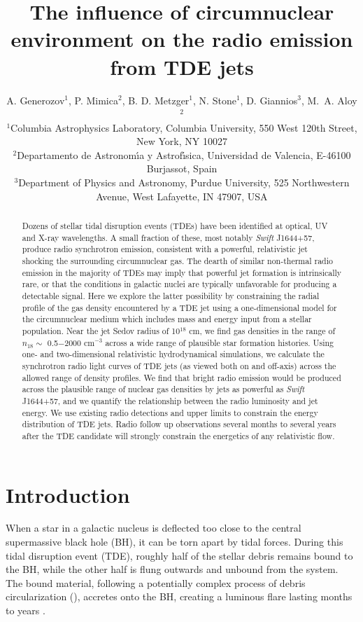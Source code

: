 \documentclass[usenatbib,fleqn]{mnras}
\title[Influence of CNM on TDE radio emission]{The influence of
  circumnuclear environment on the radio emission from TDE jets}
\author[Generozov et al.]{ A. Generozov$^{1}$, P. Mimica$^{2}$,
  B. D. Metzger$^{1}$, N. Stone$^{1}$, D. Giannios$^{3}$, 
  M.~A. Aloy$^{2}$
  \\
  $^{1}$Columbia Astrophysics Laboratory, Columbia University, 550 West 120th Street, New York, NY 10027\\
  $^{2}$Departamento de Astronom\'{\i}a y Astrof\'{\i}sica, Universidad de Valencia, E-46100 Burjassot, Spain\\
  $^{3}$Department of Physics and Astronomy, Purdue University, 525
  Northwestern Avenue, West Lafayette, IN 47907, USA}
\begin{document}
\maketitle
\begin{abstract}
  Dozens of stellar tidal disruption events (TDEs) have been
  identified at optical, UV and X-ray wavelengths.  A small fraction
  of these, most notably {\it Swift} J1644+57, produce radio
  synchrotron emission, consistent with a powerful, relativistic jet
  shocking the surrounding circumnuclear gas.  The dearth of similar
  non-thermal radio emission in the majority of TDEs may imply that
  powerful jet formation is intrinsically rare, or that the conditions
  in galactic nuclei are typically unfavorable for producing a
  detectable signal.  Here we explore the latter possibility by
  constraining the radial profile of the gas density encountered by a
  TDE jet using a one-dimensional model for the circumnuclear medium
  which includes mass and energy input from a stellar population.
  Near the jet Sedov radius of 10$^{18}$ cm, we find gas densities in
  the range of $n_{18} \sim$ 0.5$-$2000 cm$^{-3}$ across a wide range
  of plausible star formation histories.  Using one- and
  two-dimensional relativistic hydrodynamical simulations, we
  calculate the synchrotron radio light curves of TDE jets (as viewed
  both on and off-axis) across the allowed range of density profiles.
  We find that bright radio emission would be produced across the
  plausible range of nuclear gas densities by jets as powerful as {\it
    Swift} J1644+57, and we quantify the relationship between the
  radio luminosity and jet energy.  We use existing radio detections
  and upper limits to constrain the energy distribution of TDE jets.
  Radio follow up observations several months to several years after the TDE
  candidate will strongly constrain the energetics of any relativistic
  flow.
\end{abstract}
\section{Introduction}
\label{sec:intro}
When a star in a galactic nucleus is deflected too close to the
central supermassive black hole (BH), it can be torn apart by tidal
forces.  During this tidal disruption event (TDE), roughly half of the
stellar debris remains bound to the BH, while the other half is flung
outwards and unbound from the system.  The bound material, following a
potentially complex process of debris circularization
(\citealt{Kochanek1994,Guillochon+2013,Hayasaki+2013,Hayasaki+2015,Shiokawa+2015,Bonnerot+2015}),
accretes onto the BH, creating a luminous flare lasting months to
years \citep{Hills1975, Carter+1982, Rees1988}.
\end{document}
